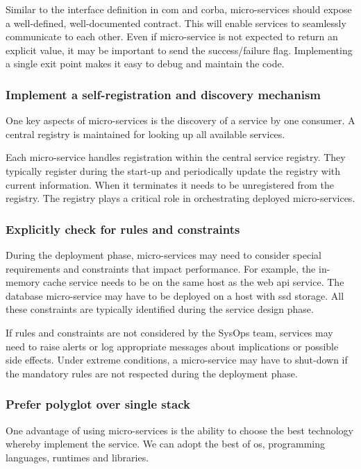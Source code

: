 Similar to the interface definition in \ac{com} and \ac{corba}, micro-services should expose a
well-defined, well-documented contract. This will enable services to seamlessly communicate to each
other. Even if micro-service is not expected to return an explicit value, it may be important to send
the success/failure flag. Implementing a single exit point makes it easy to debug and maintain the
code.

\subsubsection*[Commandment 7]{Implement a self-registration and discovery mechanism}
\label{sec:architecture-proposal-microservices-commandments-7}
One key aspects of micro-services is the discovery of a service by one consumer. A central registry is
maintained for looking up all available services.

Each micro-service handles registration within the central service registry. They typically register
during the start-up and periodically update the registry with current information. When it terminates
it needs to be unregistered from the registry. The registry plays a critical role in orchestrating
deployed micro-services.

\subsubsection*[Commandment 8]{Explicitly check for rules and constraints}
\label{sec:architecture-proposal-microservices-commandments-8}
During the deployment phase, micro-services may need to consider special requirements and constraints
that impact performance. For example, the in-memory cache service needs to be on the same host as the
web \acs{api} service. The database micro-service may have to be deployed on a host with \ac{ssd} storage.
All these constraints are typically identified during the service design phase.

If rules and constraints are not considered by the SysOps team, services may need to raise alerts or
log appropriate messages about implications or possible side effects. Under extreme conditions, a
micro-service may have to shut-down if the mandatory rules are not respected during the deployment
phase.

\subsubsection*[Commandment 9]{Prefer polyglot over single stack}
\label{sec:architecture-proposal-microservices-commandments-9}
One advantage of using micro-services is the ability to choose the best technology whereby implement
the service. We can adopt the best of \acs{os}, programming languages, runtimes and libraries.

